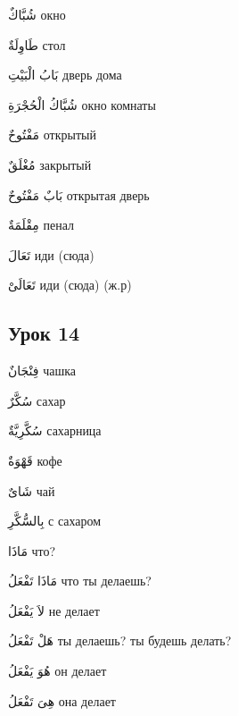 \documentclass[a5paper]{article}
\newcommand\textstyleDropCaps[1]{#1}
\newcommand\textstyleCaptioncharacters[1]{#1}
\begin{document}
\textstyleCaptioncharacters{شُبَّاكٌ }\textstyleDropCaps{окно‎}

\textstyleCaptioncharacters{طَاوِلَةٌ }\textstyleDropCaps{стол‎}

\textstyleCaptioncharacters{بَابُ الْبَيْتِ }\textstyleDropCaps{дверь дома‎}

\textstyleCaptioncharacters{شُبَّاكُ الْحُجْرَةِ }\textstyleDropCaps{окно ком­наты‎}

\textstyleCaptioncharacters{مَفْتُوحٌ }\textstyleDropCaps{открытый‎}

\textstyleCaptioncharacters{مُغْلَقٌ }\textstyleDropCaps{закрытый‎}

\textstyleCaptioncharacters{بَابٌ مَفْتُوحٌ }\textstyleDropCaps{открытая дверь‎}

\textstyleCaptioncharacters{مِقْلَمَةٌ }\textstyleDropCaps{пенал‎}

\textstyleCaptioncharacters{تَعَالَ }\textstyleDropCaps{иди (сюда)‎}

\textstyleCaptioncharacters{تَعَالَىْ }\textstyleDropCaps{иди (сюда) (ж.р)‎}

\subsection[Урок 14‎]{\textstyleDropCaps{Урок 14‎}}
\textstyleCaptioncharacters{فِنْجَانٌ }\textstyleDropCaps{чашка‎}

\textstyleCaptioncharacters{سُكَّرٌ }\textstyleDropCaps{сахар‎}

\textstyleCaptioncharacters{سُكَّرِيَّةٌ }\textstyleDropCaps{сахарница‎}

\textstyleCaptioncharacters{قَهْوَةٌ }\textstyleDropCaps{кофе‎}

\textstyleCaptioncharacters{شَاىٌ }\textstyleDropCaps{чай‎}

\textstyleCaptioncharacters{بِالسُّكَّرِ }\textstyleDropCaps{с сахаром‎}

\textstyleCaptioncharacters{مَاذَا }\textstyleDropCaps{что?‎}

\textstyleCaptioncharacters{مَاذَا تَفْعَلُ }\textstyleDropCaps{что ты дела­ешь?‎}

\textstyleCaptioncharacters{لاَ يَفْعَلُ }\textstyleDropCaps{не делает‎}

\textstyleCaptioncharacters{هَلْ تَفْعَلُ }\textstyleDropCaps{ты делаешь? ты будешь делать?‎}

\textstyleCaptioncharacters{هُوَ يَفْعَلُ }\textstyleDropCaps{он делает‎}

\textstyleCaptioncharacters{هِىَ تَفْعَلُ }\textstyleDropCaps{она делает‎}
\end{document}
